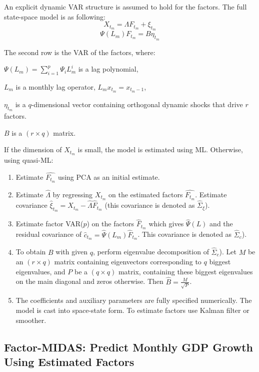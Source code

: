 \documentclass[8pt, a4paper, twocolumn, landscape]{extarticle}
\begin{document}
	An explicit dynamic VAR structure is assumed to hold for the factors. The full state-space model is as following:
	\[
	X_{t_m} = \Lambda F_{t_m}  + \xi_{t_m}
	\]
	\[
	\Psi(L_m) F_{t_m} = B \eta_{t_m}
	\]
	
	The second row is the VAR of the factors, where:
	\smallskip
	
	 $\Psi(L_m) = \sum_{i=1}^{p} \Psi_i L_m^i$ is a lag polynomial,
	 \smallskip
	 
	 $L_m$ is a monthly lag operator, $L_m x_{t_m} = x_{t_m - 1}$,
	 \smallskip
	 
	 $\eta_{t_m}$ is a $q$-dimensional vector containing orthogonal dynamic shocks that drive $r$ factors. 
	 \smallskip
	 
	 $B$ is a $(r \times q)$ matrix.
	 
	 If the dimension of $X_{t_m}$ is small, the model is estimated using ML. Otherwise, using quasi-ML:
	 
	 \begin{enumerate}
	 	\item Estimate $\hat{F_{t_m}}$ using PCA as an initial estimate.
	 	
	 	\item Estimate $\hat{\Lambda}$ by regressing $X_{t_m}$ on the estimated factors $\hat{F_{t_m}}$. Estimate covariance $\hat{\xi}_{t_m} = X_{t_m} - \hat{\Lambda}\hat{F}_{t_m}$ (this covariance is denoted as $\hat{\Sigma}_{\xi}$).
	 	
	 	\item Estimate factor VAR($p$) on the factors $\hat{F}_{t_m}$ which gives $\hat{\Psi}(L)$ and the residual covariance of $\hat{c}_{t_m} = \hat{\Psi} (L_m) \hat{F}_{t_m}$. This covariance is denoted as $\hat{\Sigma}_{c}$).
	 	
	 	\item To obtain $B$ with given $q$, perform eigenvalue decomposition of $\hat{\Sigma}_{c}$). Let $M$ be an $(r \times q)$ matrix containing eigenvectors corresponding to $q$ biggest eigenvalues, and $P$ be a $(q \times q)$ matrix, containing these biggest eigenvalues on the main diagonal and zeros otherwise. Then $\hat{B} = \frac{M}{\sqrt{P}}$.
	 	
	 	\item The coefficients and auxiliary parameters are fully specified numerically. The model is cast into space-state form. To estimate factors use Kalman filter or smoother.
	 \end{enumerate}
	 
	 \subsection{Factor-MIDAS: Predict Monthly GDP Growth Using Estimated Factors}
	 
\end{document}
